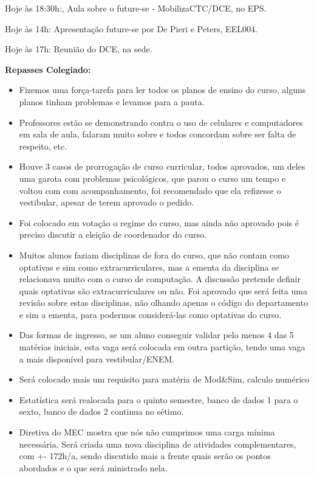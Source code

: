 \documentclass{ata-calico}
\begin{document}
\maketitle

Hoje às 18:30h:, Aula sobre o future-se - MobilizaCTC/DCE, no EPS.

Hoje às 14h: Apresentação future-se por De Pieri e Peters, EEL004.

Hoje às 17h: Reunião do DCE, na sede.\newline

\textbf{Repasses Colegiado:} \begin{itemize}

\item Fizemos uma força-tarefa para ler todos os planos de ensino do curso, alguns planos tinham problemas e levamos para a pauta. 

\item Professores estão se demonstrando contra o uso de celulares e computadores em sala de aula, falaram muito sobre e todos concordam sobre ser falta de respeito, etc. 

\item Houve 3 casos de prorrogação de curso curricular, todos aprovados, um deles uma garota com problemas psicológicos, que parou o curso um tempo e voltou com com acompanhamento, foi recomendado que ela refizesse o vestibular, apesar de terem aprovado o pedido.  

\item Foi colocado em votação o regime do curso, mas ainda não aprovado pois é preciso discutir a eleição de coordenador do curso.

\item Muitos alunos faziam disciplinas de fora do curso, que não contam como optativas e sim como extracurriculares, mas a ementa da disciplina se relacionava muito com o curso de computação. A discussão pretende definir quais optativas são extracurriculares ou não. Foi aprovado que será feita uma revisão sobre estas disciplinas, não olhando apenas o código do departamento e sim a ementa, para podermos considerá-las como optativas do curso.

\item Das formas de ingresso, se um aluno conseguir validar pelo menos 4 das 5 matérias iniciais, esta vaga será colocada em outra partição, tendo uma vaga a mais disponível para vestibular/ENEM.

\item Será colocado mais um requisito para matéria de Mod\&Sim, calculo numérico

\item Estatística será realocada para o quinto semestre, banco de dados 1 para o sexto, banco de dados 2 continua no sétimo. 

\item Diretiva do MEC mostra que nós não cumprimos uma carga mínima necessária. Será criada uma nova disciplina de atividades complementares, com +- 172h/a, sendo discutido mais a frente quais serão os pontos abordados e o que será ministrado nela. 
\end{itemize}
\end{document}
